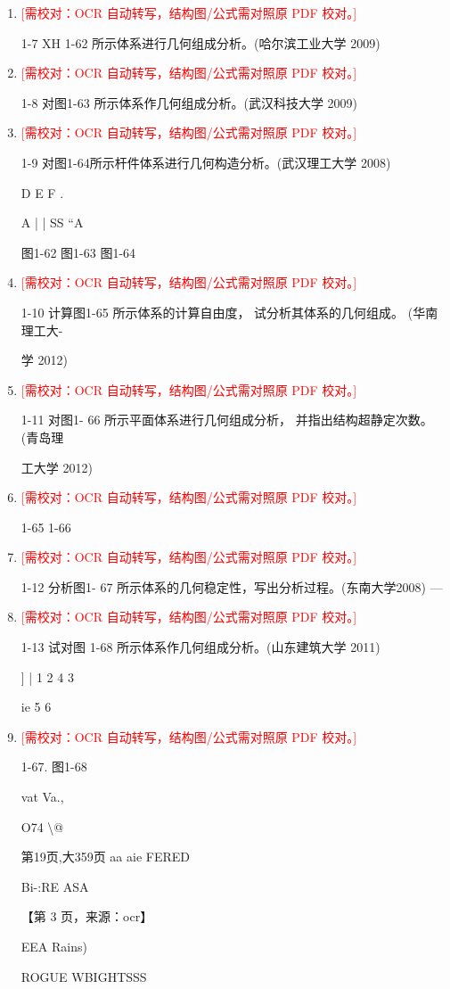 \documentclass[UTF8,12pt,a4paper,openany]{ctexbook}
\newcommand{\TODO}[1]{\textcolor{red}{[需校对：#1]}}
\begin{document}
\begin{enumerate}[label=\textbf{\arabic*.},leftmargin=2em]
\item \TODO{OCR 自动转写，结构图/公式需对照原 PDF 校对。}\par 1-7 XH 1-62 所示体系进行几何组成分析。(哈尔滨工业大学 2009)
\item \TODO{OCR 自动转写，结构图/公式需对照原 PDF 校对。}\par 1-8 对图1-63 所示体系作几何组成分析。(武汉科技大学 2009)
\item \TODO{OCR 自动转写，结构图/公式需对照原 PDF 校对。}\par 1-9 对图1-64所示杆件体系进行几何构造分析。(武汉理工大学 2008)\par D                E             F                                                                                      .\par A            |           |                                                     SS  “A\par 图1-62                图1-63        图1-64
\item \TODO{OCR 自动转写，结构图/公式需对照原 PDF 校对。}\par 1-10 计算图1-65 所示体系的计算自由度，  试分析其体系的几何组成。 (华南理工大-\par 学 2012)
\item \TODO{OCR 自动转写，结构图/公式需对照原 PDF 校对。}\par 1-11 对图1- 66 所示平面体系进行几何组成分析，  并指出结构超静定次数。  (青岛理\par 工大学 2012)
\item \TODO{OCR 自动转写，结构图/公式需对照原 PDF 校对。}\par 1-65 1-66
\item \TODO{OCR 自动转写，结构图/公式需对照原 PDF 校对。}\par 1-12 分析图1- 67 所示体系的几何稳定性，写出分析过程。(东南大学2008) —
\item \TODO{OCR 自动转写，结构图/公式需对照原 PDF 校对。}\par 1-13 试对图 1-68 所示体系作几何组成分析。(山东建筑大学 2011)\par ]                     |           1         2      4                         3\par ie                                 5            6
\item \TODO{OCR 自动转写，结构图/公式需对照原 PDF 校对。}\par 1-67.                                       图1-68\par vat Va.,\par O74 \textbackslash{}@\par 第19页,大359页                                 aa aie FERED\par Bi-:RE ASA\par \par 【第 3 页，来源：ocr】\par EEA Rains)\par ROGUE WBIGHTSSS

\end{enumerate}
\end{document}

